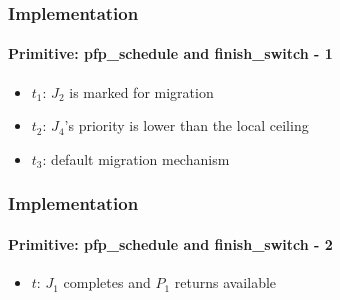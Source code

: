 
\begin{frame}
	\frametitle{Implementation}
	\framesubtitle{Primitive: pfp\_schedule and finish\_switch - 1}

	\centerline{\MrsPProtocolsHarder}

	\begin{itemize}
	\item $t_1$: $J_2$ is marked for migration
	\item $t_2$: $J_4$'s priority is lower than the local ceiling
	\item $t_3$: default migration mechanism
	\end{itemize}
\end{frame}

\begin{frame}
	\frametitle{Implementation}
	\framesubtitle{Primitive: pfp\_schedule and finish\_switch - 2}

	\centerline{\MrsPProtocolsHarderBis}

	\begin{itemize}
	\item $t$: $J_1$ completes and $P_1$ returns available
	\end{itemize}
\end{frame}
